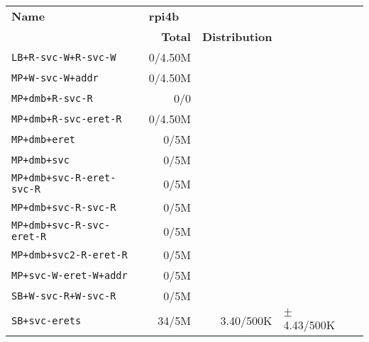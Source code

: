 \begin{tabular}{l  | r r l l}
   \textbf{Name}                  & \multicolumn{3}{l}{\textbf{rpi4b}}                       & \\
                                  & \textbf{Total} & \textbf{Distribution} &                 & \\
        \verb|LB+R-svc-W+R-svc-W| &        0/4.50M &                       &                 & \\ \hline 
           \verb|MP+W-svc-W+addr| &        0/4.50M &                       &                 & \\ \hline 
            \verb|MP+dmb+R-svc-R| &            0/0 &                       &                 & \\ \hline 
       \verb|MP+dmb+R-svc-eret-R| &        0/4.50M &                       &                 & \\ \hline 
               \verb|MP+dmb+eret| &           0/5M &                       &                 & \\ \hline 
                \verb|MP+dmb+svc| &           0/5M &                       &                 & \\ \hline 
   \verb|MP+dmb+svc-R-eret-svc-R| &           0/5M &                       &                 & \\ \hline 
        \verb|MP+dmb+svc-R-svc-R| &           0/5M &                       &                 & \\ \hline 
   \verb|MP+dmb+svc-R-svc-eret-R| &           0/5M &                       &                 & \\ \hline 
      \verb|MP+dmb+svc2-R-eret-R| &           0/5M &                       &                 & \\ \hline 
      \verb|MP+svc-W-eret-W+addr| &           0/5M &                       &                 & \\ \hline 
        \verb|SB+W-svc-R+W-svc-R| &           0/5M &                       &                 & \\ \hline 
              \verb|SB+svc-erets| &          34/5M &             3.40/500K & $\pm$ 4.43/500K & \\ \hline 
\end{tabular}
